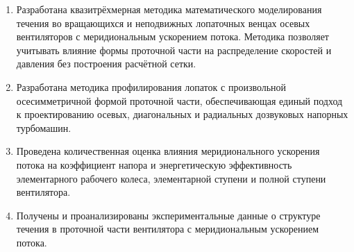 {\novelty}
\begin{enumerate}[beginpenalty=10000] %
	\item Разработана квазитрёхмерная методика математического моделирования течения во вращающихся и неподвижных лопаточных венцах осевых вентиляторов с меридиональным ускорением потока. Методика позволяет учитывать влияние формы проточной части на распределение скоростей и давления без построения расчётной сетки.

	\item Разработана методика профилирования лопаток с произвольной осесимметричной формой проточной части, обеспечивающая единый подход к проектированию осевых, диагональных и радиальных дозвуковых напорных турбомашин.

	\item Проведена количественная оценка влияния меридионального ускорения потока на коэффициент напора и энергетическую эффективность элементарного рабочего колеса, элементарной ступени и полной ступени вентилятора.

	\item Получены и проанализированы экспериментальные данные о структуре течения в проточной части вентилятора с меридиональным ускорением потока.
\end{enumerate}

